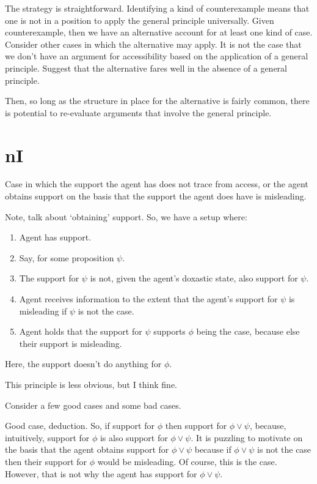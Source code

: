 \documentclass[10pt]{article}
\begin{document}
The strategy is straightforward.
Identifying a kind of counterexample means that one is not in a position to apply the general principle universally.
Given counterexample, then we have an alternative account for at least one kind of case.
Consider other cases in which the alternative may apply.
It is not the case that we don't have an argument for accessibility based on the application of a general principle.
Suggest that the alternative fares well in the absence of a general principle.

Then, so long as the structure in place for the alternative is fairly common, there is potential to re-evaluate arguments that involve the general principle.









\newpage

\section{nI}
\label{sec:ni}

Case in which the support the agent has does not trace from access, or the agent obtains support on the basis that the support the agent does have is misleading.

Note, talk about `obtaining' support.
So, we have a setup where:

\begin{enumerate}
\item Agent has support.
\item Say, for some proposition \(\psi\).
\item The support for \(\psi\) is not, given the agent's doxastic state, also support for \(\psi\).
\item Agent receives information to the extent that the agent's support for \(\psi\) is misleading if \(\psi\) is not the case.
\item Agent holds that the support for \(\psi\) supports \(\phi\) being the case, because else their support is misleading.
\end{enumerate}

Here, the support doesn't do anything for \(\phi\).

This principle is less obvious, but I think fine.

Consider a few good cases and some bad cases.

Good case, deduction.
So, if support for \(\phi\) then support for \(\phi \lor \psi\), because, intuitively, support for \(\phi\) is also support for \(\phi \lor \psi\).
It is puzzling to motivate on the basis that the agent obtains support for \(\phi \lor \psi\) because if \(\phi \lor \psi\) is not the case then their support for \(\phi\) would be misleading.
Of course, this is the case.
However, that is not why the agent has support for \(\phi \lor \psi\).
\end{document}
